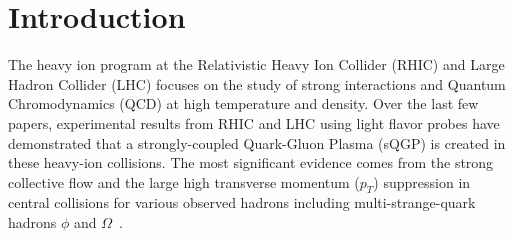 \documentclass[%
 reprint,	
 amsmath,amssymb,
 aps,
 prc,
]{revtex4-1}
\begin{document}
\maketitle
%
%
%

\section{Introduction}
\label{introduction}

The heavy ion program at the Relativistic Heavy Ion Collider (RHIC) and Large Hadron Collider (LHC) focuses on the study of strong interactions and Quantum Chromodynamics (QCD) at high temperature and density. Over the last few papers, experimental results from RHIC and LHC using light flavor probes have demonstrated that a strongly-coupled Quark-Gluon Plasma (sQGP) is created in these heavy-ion collisions. The most significant evidence comes from the strong collective flow and the large high transverse momentum ($p_{T}$) suppression in central collisions for various observed hadrons including multi-strange-quark hadrons $\phi$ and $\Omega$~\cite{StarWhitePaper,PhenixWhitePaper,LhcSummary,Adamczyk:2015ukd,Abelev:2014pua}.
\end{document}
